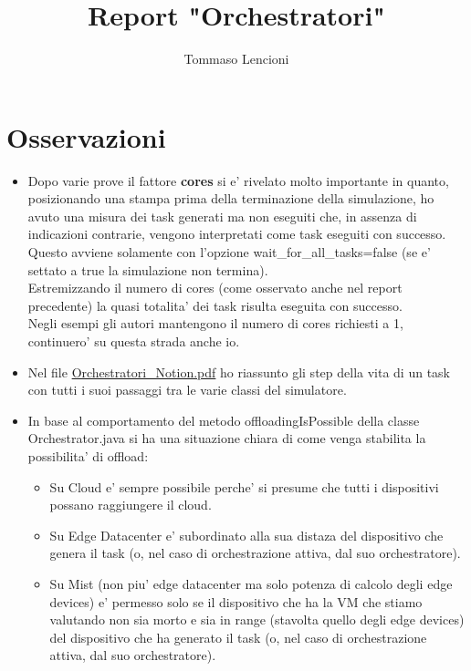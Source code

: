 \documentclass[12pt, a4paper]{report} %
\title{Report "Orchestratori"}
\author{Tommaso Lencioni}
\begin{document}
\section*{Osservazioni}
 \begin{itemize}
 	\item Dopo varie prove il fattore \textbf{cores} si e' rivelato molto importante in quanto, posizionando una stampa prima della terminazione della simulazione, ho avuto una misura dei task generati ma non eseguiti che, in assenza di indicazioni contrarie, vengono interpretati come task eseguiti con successo.\\
 	Questo avviene solamente con l'opzione wait\_for\_all\_tasks=false (se e' settato a true la simulazione non termina).\\
 	Estremizzando il numero di cores (come osservato anche nel report precedente) la quasi totalita' dei task risulta eseguita con successo.\\
 	Negli esempi gli autori mantengono il numero di cores richiesti a 1, continuero' su questa strada anche io.
 	\item Nel file \href{https://github.com/TommasoLencioni/PES/blob/4ccb63e670c42736d5d72610bd04af4832b2944a/simulations/Orchestratori/Orchestratori_Notion.pdf}{Orchestratori\_Notion.pdf} ho riassunto gli step della vita di un task con tutti i suoi passaggi tra le varie classi del simulatore.
 	\item In base al comportamento del metodo offloadingIsPossible della classe Orchestrator.java si ha una situazione chiara di come venga stabilita la possibilita' di offload:
 	\begin{itemize}
 		\item Su Cloud e' sempre possibile perche' si presume che tutti i dispositivi possano raggiungere il cloud.
 		\item Su Edge Datacenter e' subordinato alla sua distaza del dispositivo che genera il task (o, nel caso di orchestrazione attiva, dal suo orchestratore).
 		\item Su Mist (non piu' edge datacenter ma solo potenza di calcolo degli edge devices) e' permesso solo se il dispositivo che ha la VM che stiamo valutando non sia morto e sia in range (stavolta quello degli edge devices) del dispositivo che ha generato il task (o, nel caso di orchestrazione attiva, dal suo orchestratore).
 	\end{itemize}

\end{itemize}
\end{document}
